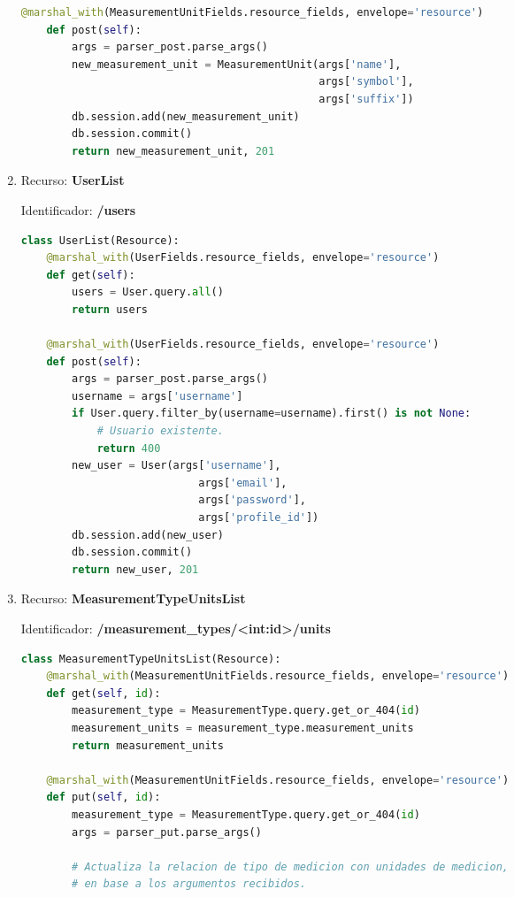 \documentclass[a4paper,12pt]{article}
\begin{document}
\begin{enumerate}
\begin{lstlisting}[language=Python]
    @marshal_with(MeasurementUnitFields.resource_fields, envelope='resource')
    def post(self):
        args = parser_post.parse_args()
        new_measurement_unit = MeasurementUnit(args['name'],
                                               args['symbol'],
                                               args['suffix'])
        db.session.add(new_measurement_unit)
        db.session.commit()
        return new_measurement_unit, 201
\end{lstlisting}

\item Recurso: \textbf{UserList}

Identificador: \textbf{/users}

\begin{lstlisting}[language=Python]
class UserList(Resource):
    @marshal_with(UserFields.resource_fields, envelope='resource')
    def get(self):
        users = User.query.all()
        return users

    @marshal_with(UserFields.resource_fields, envelope='resource')
    def post(self):
        args = parser_post.parse_args()
        username = args['username']
        if User.query.filter_by(username=username).first() is not None:
            # Usuario existente.
            return 400
        new_user = User(args['username'],
                            args['email'],
                            args['password'],
                            args['profile_id'])
        db.session.add(new_user)
        db.session.commit()
        return new_user, 201
\end{lstlisting}

\item Recurso: \textbf{MeasurementTypeUnitsList}

Identificador: \textbf{/measurement\_types/<int:id>/units}

\begin{lstlisting}[language=Python]
class MeasurementTypeUnitsList(Resource):
    @marshal_with(MeasurementUnitFields.resource_fields, envelope='resource')
    def get(self, id):
        measurement_type = MeasurementType.query.get_or_404(id)
        measurement_units = measurement_type.measurement_units
        return measurement_units

    @marshal_with(MeasurementUnitFields.resource_fields, envelope='resource')
    def put(self, id):
        measurement_type = MeasurementType.query.get_or_404(id)
        args = parser_put.parse_args()

        # Actualiza la relacion de tipo de medicion con unidades de medicion,
        # en base a los argumentos recibidos.


\end{lstlisting}
\end{enumerate}
\end{document}
